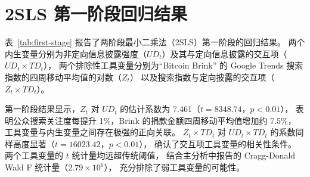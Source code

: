 \chapter{2SLS 第一阶段回归结果}

表~\ref{tab:first-stage} 报告了两阶段最小二乘法（2SLS）第一阶段的回归结果。
两个内生变量分别为非定向信息披露强度（$UD_t$）及其与定向信息披露的交互项（$UD_t \times TD_t$），
两个排除性工具变量分别为“Bitcoin Brink” 的 Google Trends 搜索指数的四周移动平均值的对数（$Z_t$）
以及搜索指数与定向披露的交互项（$Z_t \times TD_t$）。

第一阶段结果显示，$Z_t$ 对 $UD_t$ 的估计系数为 7.461（$t = 8348.74$，$p < 0.01$），
表明公众搜索关注度每提升 1\%，Brink 的捐款金额四周移动平均值增加约 7.5\%，
工具变量与内生变量之间存在极强的正向关联。
$Z_t \times TD_t$ 对 $UD_t \times TD_t$ 的系数同样高度显著（$t = 16023.42$，$p < 0.01$），
确认了交互项工具变量的相关性条件。
两个工具变量的 $t$ 统计量均远超传统阈值，
结合主分析中报告的 Cragg-Donald Wald F 统计量（$2.79 \times 10^6$），
充分排除了弱工具变量的可能性。

